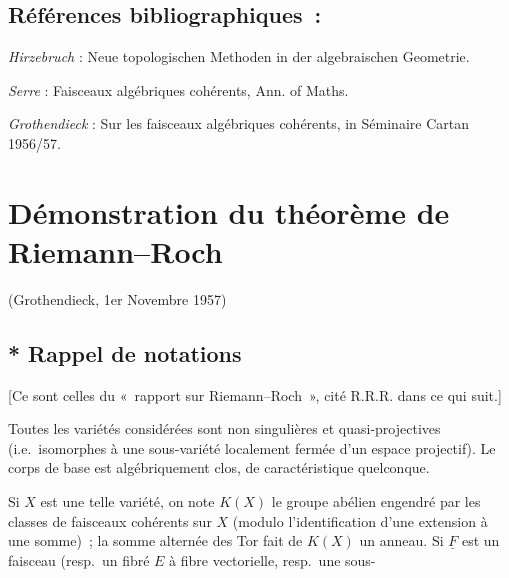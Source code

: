 \subsection*{Références bibliographiques~:}
\begin{enumerate}[label={[\arabic*]}]
\item \emph{Hirzebruch} : Neue topologischen Methoden in der algebraischen Geometrie.
\item \emph{Serre} : Faisceaux algébriques cohérents, Ann. of Maths.
\item \emph{Grothendieck} : Sur les faisceaux algébriques cohérents, in Séminaire Cartan 1956/57.
\end{enumerate}

\section*{Démonstration du théorème de Riemann--Roch}
\begin{center}
(Grothendieck, 1er Novembre 1957)
\end{center}

\subsection*{* Rappel de notations\footnotemark}
[Ce sont celles du «~rapport sur Riemann--Roch~», cité R.R.R. dans ce qui suit.]

Toutes les variétés considérées sont non singulières et quasi-projectives (i.e.\ isomorphes à une sous-variété localement fermée d'un espace projectif). Le corps de base est algébriquement clos, de caractéristique quelconque.

Si \(X\) est une telle variété, on note \(K(X)\) le groupe abélien engendré par les classes de faisceaux cohérents sur \(X\) (modulo l'identification d'une extension à une somme)~; la somme alternée des Tor fait de \(K(X)\) un anneau. Si \(\underline F\) est un faisceau (resp.\ un fibré \(E\) à fibre vectorielle, resp.\ une sous-%
